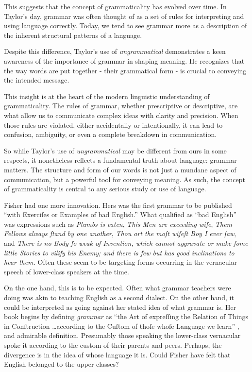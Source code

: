 This suggests that the concept of grammaticality has evolved over time. In Taylor's day, grammar was often thought of as a set of rules for interpreting and using language correctly. Today, we tend to see grammar more as a description of the inherent structural patterns of a language.

Despite this difference, Taylor's use of \textit{ungrammatical} demonstrates a keen awareness of the importance of grammar in shaping meaning. He recognizes that the way words are put together - their grammatical form - is crucial to conveying the intended message.

This insight is at the heart of the modern linguistic understanding of grammaticality. The rules of grammar, whether prescriptive or descriptive, are what allow us to communicate complex ideas with clarity and precision. When those rules are violated, either accidentally or intentionally, it can lead to confusion, ambiguity, or even a complete breakdown in communication.

So while Taylor's use of \textit{ungrammatical} may be different from ours in some respects, it nonetheless reflects a fundamental truth about language: grammar matters. The structure and form of our words is not just a mundane aspect of communication, but a powerful tool for conveying meaning. As such, the concept of grammaticality is central to any serious study or use of language.

\bigskip

Fisher had one more innovation. Hers was the first grammar to be published ``with Exerciſes or Examples of bad English.'' What qualified as ``bad English'' was expressions such as \textit{Plumbs is eaten}, \textit{This Men are exceeding wiſe}, \textit{Them Fellows always ſtand by one another}, \textit{Thou art the moſt wiſeſt Boy I ever ſaw}, and \textit{There is no Body ſo weak of Invention, which cannot aggravate or make ſome little Stories to vilify his Enemy; and there is few but has good inclinations to hear them.} Often these seem to be targeting forms occurring in the vernacular speech of lower-class speakers at the time.

On the one hand, this is to be expected. Often what grammar teachers were doing was akin to teaching English as a second dialect. On the other hand, it could be interpreted as going against her stated idea of what grammar is. Her book begins by defining \textit{grammar} as ``the Art of expreſſing the Relation of Things in Conſtruction \dots according to the Cuſtom of thoſe whoſe Language we learn'' \citep[1]{Fisher1785}, and admirable definition. Presumably those speaking the lower-class vernacular spoke it according to the custom of their parents and peers. Perhaps, the divergence is in the idea of whose language it is. Could Fisher have felt that English belonged to the upper classes?


